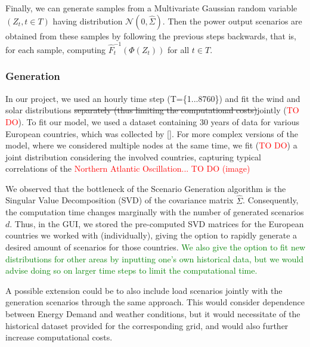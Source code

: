 Finally, we can generate samples from a Multivariate Gaussian random variable \((Z_{t}, t \in T)\) having distribution \(\mathcal{N}(0, \hat \Sigma)\).  Then the power output scenarios are obtained from these samples by following the previous steps backwards, that is, for each sample, computing \(\hat F_{t}^{-1}(\Phi(Z_{t}))\) for all \(t\in T\). \\

\subsubsection{Generation}
In our project, we used an hourly time step (T=\{1...8760\}) and fit the wind and solar distributions \st{separately (thus limiting the computational costs)}jointly (\textcolor{red}{TO DO}). To fit our model, we used a dataset containing 30 years of data for various European countries, which was collected by [\cite{PVDataSet}]. 
For more complex versions of the model, where we considered multiple nodes at the same time, we fit (\textcolor{red}{TO DO}) a joint distribution considering the involved countries, capturing typical correlations of the \textcolor{red}{Northern Atlantic Oscillation... TO DO (image)} 

We observed that the bottleneck of the Scenario Generation algorithm is the Singular Value Decomposition (SVD) of the covariance matrix \(\hat{\Sigma}\). Consequently, the computation time changes marginally with the number of generated scenarios \(d\). Thus, in the GUI, we stored the pre-computed SVD matrices for the European countries we worked with (individually), giving the option to rapidly generate a desired amount of scenarios for those countries. \textcolor{green}{We also give the option to fit new distributions for other areas by inputting one's own historical data, but we would advise doing so on larger time steps to limit the computational time. }

A possible extension could be to also include load scenarios jointly with the generation scenarios through the same approach. This would consider dependence between Energy Demand and weather conditions, but it would necessitate of the historical dataset provided for the corresponding grid, and would also further increase computational costs.
